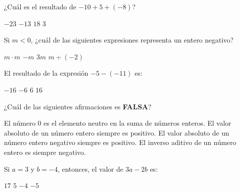 \documentclass[spanish,letterpaper, 12pt, addpoints, answers]{exam}
\begin{document}
\begin{questions}


    \question[1] ¿Cuál es el resultado de $-10+5+(-8)$?

    \begin{choices}
        \choice $-23$
        \CorrectChoice $-13$
        \choice $18$
        \choice $3$
    \end{choices}

    \vspace{0.15in}

    \question[1] Si $m<0$, ¿cuál de las siguientes expresiones representa un entero negativo?

    \begin{choices}
        \choice $m\cdot m$
        \choice $-m$
        \CorrectChoice $3m$
        \choice $m\div (-2)$
    \end{choices}

    \vspace{0.15in}


    \question[1] El resultado de la expresión $-5-(-11)$ es:
    \begin{choices}
        \choice $-16$
        \choice $-6$
        \CorrectChoice $6$
        \choice $16$
    \end{choices}

    \vspace{0.15in}

    \setlength{\multicolsep}{0.5em}
    \question[1] ¿Cuál de las siguientes afirmaciones es \textbf{FALSA}?

    \begin{choices}
        \choice El número 0 es el elemento neutro en la suma de números enteros.
        \CorrectChoice El valor absoluto de un número entero siempre es positivo.
        \choice El valor absoluto de un número entero negativo siempre es positivo.
        \choice El inverso aditivo de un número entero es siempre negativo.
    \end{choices}
    \vspace{0.15in}

    \question[1] Si $a=3$ y $b=-4$, entonces, el valor de $3a-2b$ es:
    \begin{choices}
        \CorrectChoice $17$
        \choice $5$
        \choice $-4$
        \choice $-5$
    \end{choices}
    \vspace{0.15in}


\end{questions}
\end{document}
